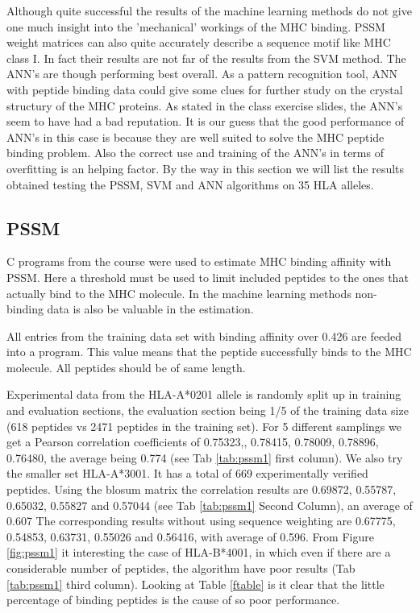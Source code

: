 


Although quite successful the results of the machine learning methods do not give one much insight into the 'mechanical' workings of the MHC binding.
PSSM weight matrices can also quite accurately describe a sequence motif like MHC class I. In fact their results are not far of the results from the SVM method. The ANN's are though performing best overall.
As a pattern recognition tool, ANN with peptide binding data could give some clues for further study on the crystal structury of the MHC proteins.
As stated in the class exercise slides, the ANN's seem to have had a bad reputation. 
It is our guess that the good performance of ANN's in this case is because they are well suited to solve the MHC peptide binding problem. 
Also the correct use and training of the ANN's in terms of overfitting is an helping factor.
By the way in this section we will list the results obtained testing the PSSM, SVM and ANN algorithms on 35 HLA alleles.

\subsection*{PSSM}


C programs from the course were used to estimate MHC binding affinity with PSSM. 
Here a threshold must be used to limit included peptides to the ones that actually bind to the MHC molecule. 
In the machine learning methods non-binding data is also be valuable in the estimation.

All entries from the training data set with binding affinity over 0.426 are feeded into a program. 
This value means that the peptide successfully binds to the MHC molecule. All peptides should be of same length.

Experimental data from the HLA-A*0201 allele is randomly split up in training and evaluation sections, the evaluation section being 1/5 of the training data size (618 peptides vs 2471 peptides in the training set).
For 5 different samplings we get a Pearson correlation coefficients of {0.75323,, 0.78415, 0.78009, 0.78896, 0.76480}, the average being 0.774 (see Tab \ref{tab:pssm1} first column).
We also try the smaller set HLA-A*3001. It has a total of 669 experimentally verified peptides.
Using the blosum matrix the correlation results are 0.69872, 0.55787, 0.65032, 0.55827 and 0.57044 (see Tab \ref{tab:pssm1} Second Column), an average of 0.607
The corresponding results without using sequence weighting are 0.67775, 0.54853, 0.63731, 0.55026 and 0.56416, with average of 0.596.
From Figure \ref{fig:pssm1} it interesting the case of HLA-B*4001, in which even if there are a considerable number of peptides, the algorithm have poor results (Tab \ref{tab:pssm1} third column). Looking at Table \ref{ftable} is it clear that the little percentage of binding peptides is the cause of so poor performance. 


